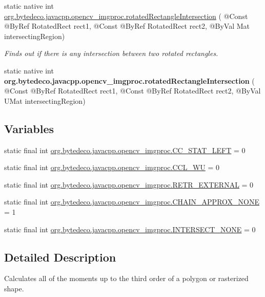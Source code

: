 \begin{DoxyCompactItemize}
static native int \hyperlink{group__imgproc__shape_gadcfa20fed89c804a31f05ae6e1023379}{org.\+bytedeco.\+javacpp.\+opencv\+\_\+imgproc.\+rotated\+Rectangle\+Intersection} ( @Const @By\+Ref Rotated\+Rect rect1, @Const @By\+Ref Rotated\+Rect rect2, @By\+Val Mat intersecting\+Region)
\begin{DoxyCompactList}\small\item\em Finds out if there is any intersection between two rotated rectangles. \end{DoxyCompactList}\item 
\mbox{\label{group__imgproc__shape_ga3b6f1be65a6265484440e694bcf84f90}} 
static native int {\bfseries org.\+bytedeco.\+javacpp.\+opencv\+\_\+imgproc.\+rotated\+Rectangle\+Intersection} ( @Const @By\+Ref Rotated\+Rect rect1, @Const @By\+Ref Rotated\+Rect rect2, @By\+Val U\+Mat intersecting\+Region)
\end{DoxyCompactItemize}
\subsection*{Variables}
\begin{DoxyCompactItemize}
\item 
static final int \hyperlink{group__imgproc__shape_ga349952fcbf280ca92c36978312c607a6}{org.\+bytedeco.\+javacpp.\+opencv\+\_\+imgproc.\+C\+C\+\_\+\+S\+T\+A\+T\+\_\+\+L\+E\+FT} = 0
\item 
static final int \hyperlink{group__imgproc__shape_ga9b0d3771ada15612aef51a25db60c21f}{org.\+bytedeco.\+javacpp.\+opencv\+\_\+imgproc.\+C\+C\+L\+\_\+\+WU} = 0
\item 
static final int \hyperlink{group__imgproc__shape_ga94d7307a24949485303f94d555fd31c8}{org.\+bytedeco.\+javacpp.\+opencv\+\_\+imgproc.\+R\+E\+T\+R\+\_\+\+E\+X\+T\+E\+R\+N\+AL} = 0
\item 
static final int \hyperlink{group__imgproc__shape_ga2e9681fae693a35abe17e8f4265acdbf}{org.\+bytedeco.\+javacpp.\+opencv\+\_\+imgproc.\+C\+H\+A\+I\+N\+\_\+\+A\+P\+P\+R\+O\+X\+\_\+\+N\+O\+NE} = 1
\item 
static final int \hyperlink{group__imgproc__shape_gae1ca9924d0a73e52ad45f660cc2160e4}{org.\+bytedeco.\+javacpp.\+opencv\+\_\+imgproc.\+I\+N\+T\+E\+R\+S\+E\+C\+T\+\_\+\+N\+O\+NE} = 0
\end{DoxyCompactItemize}


\subsection{Detailed Description}
Calculates all of the moments up to the third order of a polygon or rasterized shape. 

